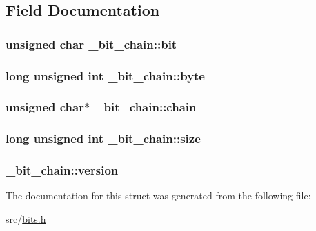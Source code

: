 \subsection{\-Field \-Documentation}
\hypertarget{struct__bit__chain_ac5067ccd8cb8d9655b8cfb3d26704a8d}{
\subsubsection[{bit}]{\setlength{\rightskip}{0pt plus 5cm}unsigned char {\bf \-\_\-bit\-\_\-chain\-::bit}}}\label{struct__bit__chain_ac5067ccd8cb8d9655b8cfb3d26704a8d}
\hypertarget{struct__bit__chain_a33b30db9863ac6778619e406788393fa}{
\subsubsection[{byte}]{\setlength{\rightskip}{0pt plus 5cm}long unsigned int {\bf \-\_\-bit\-\_\-chain\-::byte}}}\label{struct__bit__chain_a33b30db9863ac6778619e406788393fa}
\hypertarget{struct__bit__chain_a7978cb53bea093be7176546d7fd6ffdf}{
\subsubsection[{chain}]{\setlength{\rightskip}{0pt plus 5cm}unsigned char$\ast$ {\bf \-\_\-bit\-\_\-chain\-::chain}}}\label{struct__bit__chain_a7978cb53bea093be7176546d7fd6ffdf}
\hypertarget{struct__bit__chain_a3082df3e88e0e5a5649ad49598f83ca2}{
\subsubsection[{size}]{\setlength{\rightskip}{0pt plus 5cm}long unsigned int {\bf \-\_\-bit\-\_\-chain\-::size}}}\label{struct__bit__chain_a3082df3e88e0e5a5649ad49598f83ca2}
\hypertarget{struct__bit__chain_aa5db3d09cb7fdf3627945acb5555e841}{
\subsubsection[{version}]{ {\bf \-\_\-bit\-\_\-chain\-::version}}}\label{struct__bit__chain_aa5db3d09cb7fdf3627945acb5555e841}


\-The documentation for this struct was generated from the following file\-:\begin{DoxyCompactItemize}
\item 
src/\hyperlink{bits_8h}{bits.\-h}\end{DoxyCompactItemize}
